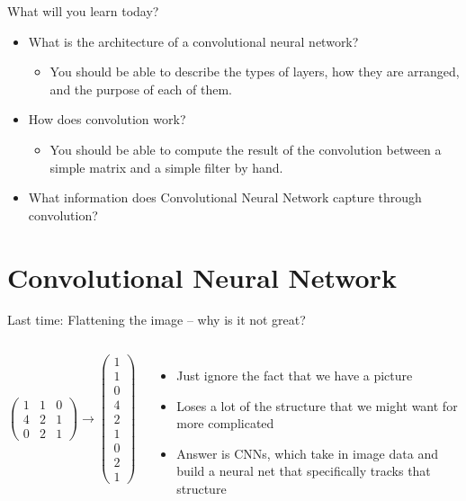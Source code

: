 \documentclass[aspectratio=169,usenames,dvipsnames]{beamer}
\newcommand{\InstructorList}[1]{
\begin{itemize}
	\color{orange}
	#1
\end{itemize}
}
\begin{document}
\begin{frame}[t]{What will you learn today?}

\begin{itemize}
	\item What is the architecture of a convolutional neural network?
		\begin{itemize}
			\item You should be able to describe the types of layers, how they are arranged, and the purpose of each of them. 
		\end{itemize}
	\item How does convolution work? 
		\begin{itemize}
			\item You should be able to compute the result of the convolution between a simple matrix and a simple filter by hand. 
		\end{itemize}
	\item What information does Convolutional Neural Network capture through convolution? 
\end{itemize}

\end{frame}


\section{Convolutional Neural Network }

\begin{frame}[t]{Last time: Flattening the image -- why is it not great?}
\begin{columns}
\centering

\[
\begin{pmatrix}
	1 & 1 & 0 \\
	4 & 2 & 1 \\
	0 & 2 & 1
\end{pmatrix}	
\longrightarrow
\begin{pmatrix}
	1 \\ 1 \\ 0 \\
	4 \\ 2 \\ 1 \\
	0 \\ 2 \\ 1
\end{pmatrix}
\]


\centering

\InstructorList{
  \item Just ignore the fact that we have a picture 
  \item Loses a lot of the structure that we might want for more complicated
  \item Answer is CNNs, which take in image data and build a neural net that specifically tracks that structure
}

\end{columns}
\end{frame}
\end{document}
